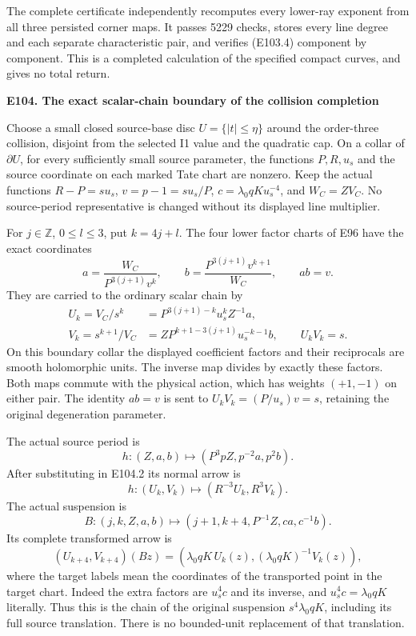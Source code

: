 The complete certificate  independently recomputes every lower-ray exponent from all three persisted corner maps. It passes 5229 checks, stores every line degree and each separate characteristic pair, and verifies (E103.4) component by component. This is a completed calculation of the specified compact curves, and gives no total return.

\par

\medskip\noindent\textbf{E104. The exact scalar-chain boundary of the collision completion}

\par\nobreak

Choose a small closed source-base disc \(U=\{|t|\leq\eta\}\) around the order-three collision, disjoint from the selected I1 value and the quadratic cap. On a collar of \(\partial U\), for every sufficiently small source parameter, the functions \(P,R,u_s\) and the source coordinate on each marked Tate chart are nonzero. Keep the actual functions \(R-P=s u_s\), \(v=p-1=s u_s/P\), \(c=\lambda_0qK u_s^{-4}\), and \(W_C=ZV_C\). No source-period representative is changed without its displayed line multiplier.

For \(j\in\mathbb Z\), \(0\leq l\leq3\), put \(k=4j+l\). The four lower factor charts of E96 have the exact coordinates
\[
 a=\frac{W_C}{P^{3(j+1)}v^k},\qquad
 b=\frac{P^{3(j+1)}v^{k+1}}{W_C},\qquad ab=v.
 \tag{E104.1}
\]
They are carried to the ordinary scalar chain by
\[
 \begin{aligned}
 U_k=V_C/s^k
    &=P^{3(j+1)-k}u_s^kZ^{-1}a,\\
 V_k=s^{k+1}/V_C
    &=ZP^{k+1-3(j+1)}u_s^{-k-1}b,
 \qquad U_kV_k=s.
 \end{aligned}
 \tag{E104.2}
\]
On this boundary collar the displayed coefficient factors and their reciprocals are smooth holomorphic units. The inverse map divides by exactly these factors. Both maps commute with the physical action, which has weights \((+1,-1)\) on either pair. The identity \(ab=v\) is sent to \(U_kV_k=(P/u_s)v=s\), retaining the original degeneration parameter.

The actual source period is
\[
 h:(Z,a,b)\longmapsto(P^3pZ,p^{-2}a,p^2b).
\]
After substituting in E104.2 its normal arrow is
\[
          h:(U_k,V_k)\longmapsto(R^{-3}U_k,R^3V_k).
 \tag{E104.3}
\]
The actual suspension is
\[
 B:(j,k,Z,a,b)\longmapsto
       (j+1,k+4,P^{-1}Z,ca,c^{-1}b).
\]
Its complete transformed arrow is
\[
 (U_{k+4},V_{k+4})(Bz)
       =(\lambda_0qK\,U_k(z),(\lambda_0qK)^{-1}V_k(z)),
 \tag{E104.4}
\]
where the target labels mean the coordinates of the transported point in the target chart. Indeed the extra factors are \(u_s^4c\) and its inverse, and \(u_s^4c=\lambda_0qK\) literally. Thus this is the chain of the original suspension \(s^4\lambda_0qK\), including its full source translation. There is no bounded-unit replacement of that translation.

